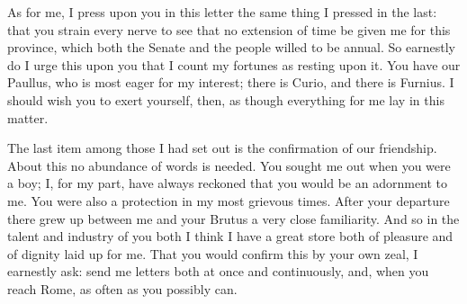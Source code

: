  As for me, I press upon you in this letter the same thing I pressed in the last: that you strain every nerve to see that no extension of time be given me for this province, which both the Senate and the people willed to be annual. So earnestly do I urge this upon you that I count my fortunes as resting upon it. You have our Paullus, who is most eager for my interest; there is Curio, and there is Furnius. I should wish you to exert yourself, then, as though everything for me lay in this matter.

 The last item among those I had set out is the confirmation of our friendship. About this no abundance of words is needed. You sought me out when you were a boy; I, for my part, have always reckoned that you would be an adornment to me. You were also a protection in my most grievous times. After your departure there grew up between me and your Brutus a very close familiarity. And so in the talent and industry of you both I think I have a great store both of pleasure and of dignity laid up for me. That you would confirm this by your own zeal, I earnestly ask: send me letters both at once and continuously, and, when you reach Rome, as often as you possibly can.
